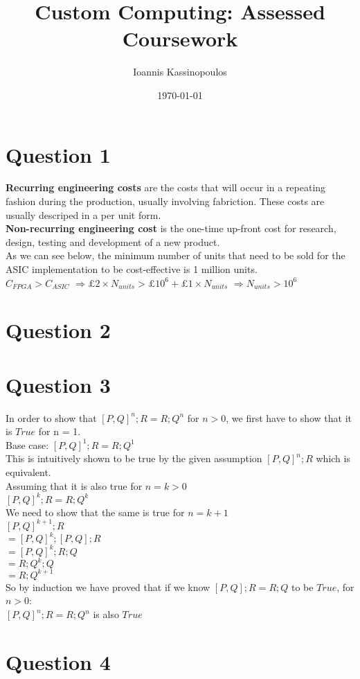 \documentclass[a4paper,10pt]{article}
\begin{document}
\title{Custom Computing: Assessed Coursework}
\author{Ioannis Kassinopoulos}
\date{\today}
\maketitle
\section*{Question 1}
\textbf{Recurring engineering costs} are the costs that will occur in a repeating fashion during the production, usually involving fabriction.
These costs are usually descriped in a per unit form.
\\[0.25cm]
\textbf{Non-recurring engineering cost} is the one-time up-front cost 
for research, design, testing and development of a new product.
\\[0.25cm]
As we can see below, the minimum number of units that need to be sold for the ASIC implementation to be cost-effective is 1 million units.
\\[0.25cm]
$C_{FPGA} > C_{ASIC}$
$\Rightarrow \pounds 2 \times N_{units} > \pounds 10^6 + \pounds 1 \times N_{units} $ 
$\Rightarrow N_{units} > 10^6$

\section*{Question 2}
\section*{Question 3}
In order to show that $[P,Q]^{n};R = R;Q^n$ for $n>0$, we first have to show that it is $True$ for n = 1.
\\[0.5cm]
Base case: $[P,Q]^{1};R=R;Q^1$
\\[0.5cm]
This is intuitively shown to be true by the given assumption $[P,Q]^{n};R$ which is equivalent.
\\[0.5cm]
Assuming that it is also true for  $n = k > 0$ 
\\[0.5cm]
$[P,Q]^{k};R = R;Q^k$
\\[0.5cm]
We need to show that the same is true for $n = k+1$ 
\\[0.5cm]
$[P,Q]^{k+1};R $
\\[0.25cm]
$= [P,Q]^k;[P,Q];R$
\\[0.25cm]
$= [P,Q]^k;R;Q$
\\[0.25cm]
$= R;Q^k;Q$
\\[0.25cm]
$= R;Q^{k+1}$
\\[0.5cm]
So by induction we have proved that if we know $[P,Q];R = R;Q$ to be $True$, for $n>0$:
\\[0.5cm]
$[P,Q]^{n};R = R;Q^n$
is also $True$

\section*{Question 4}
\end{document}
